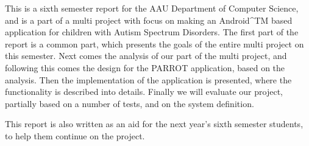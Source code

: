This is a sixth semester report for the AAU Department of Computer Science, and is a part of a multi project with focus on making an Android^{TM} based application for children with Autism Spectrum Disorders. The first part of the report is a common part, which presents the goals of the entire multi project on this semester. Next comes the analysis of our part of the multi project, and following this comes the design for the  PARROT application, based on the analysis.
Then the implementation of the application is presented, where the functionality is described into details. 
Finally we will evaluate our project, partially based on a number of tests, and on the system definition.

This report is also written as an aid for the next year's sixth semester students, to help them continue on the project.   




